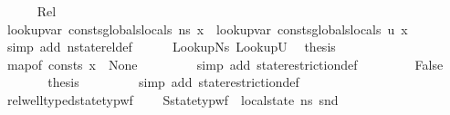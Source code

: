 \begin{isabellebody}
\ \ \ \ \isamarkupfalse%
\ Rel\ \isamarkupfalse%
\ {\isachardoublequoteopen}lookup{\isacharunderscore}{\kern0pt}var\ {\isacharparenleft}{\kern0pt}{\isacharparenleft}{\kern0pt}consts{\isacharat}{\kern0pt}globals{\isacharparenright}{\kern0pt}{\isacharcomma}{\kern0pt}locals{\isacharparenright}{\kern0pt}\ ns\ x\ {\isacharequal}{\kern0pt}\ lookup{\isacharunderscore}{\kern0pt}var\ {\isacharparenleft}{\kern0pt}{\isacharparenleft}{\kern0pt}consts{\isacharat}{\kern0pt}globals{}{\isacharparenright}{\kern0pt}{\isacharcomma}{\kern0pt}locals{}{\isacharparenright}{\kern0pt}\ u\ x{\isachardoublequoteclose}\isanewline
\ \ \ \ \ \ \isamarkupfalse%
\ {\isacharparenleft}{\kern0pt}simp\ add{\isacharcolon}{\kern0pt}\ nstate{\isacharunderscore}{\kern0pt}rel{\isacharunderscore}{\kern0pt}def{\isacharparenright}{\kern0pt}\isanewline
\ \ \ \ \isamarkupfalse%
\ LookupNs\ LookupU\ \isamarkupfalse%
\ {\isacharquery}{\kern0pt}thesis\ \isamarkupfalse%
\ {\isacartoucheopen}map{\isacharunderscore}{\kern0pt}of\ consts\ x\ {\isasymnoteq}\ None{\isacartoucheclose}\ \isanewline
\ \ \ \ \ \ \isamarkupfalse%
\ {\isacharparenleft}{\kern0pt}simp\ add{\isacharcolon}{\kern0pt}\ state{\isacharunderscore}{\kern0pt}restriction{\isacharunderscore}{\kern0pt}def{\isacharparenright}{\kern0pt}\isanewline
\ \ \isamarkupfalse%
\isanewline
\ \ \ \ \isamarkupfalse%
\ False\isanewline
\ \ \ \ \isamarkupfalse%
\ \isamarkupfalse%
\ {\isacharquery}{\kern0pt}thesis\ \isanewline
\ \ \ \ \ \ \isamarkupfalse%
\ {\isacharparenleft}{\kern0pt}simp\ add{\isacharcolon}{\kern0pt}\ state{\isacharunderscore}{\kern0pt}restriction{\isacharunderscore}{\kern0pt}def{\isacharparenright}{\kern0pt}\ \ \ \ \ \ \isanewline
\ \ \isamarkupfalse%
\isanewline
{}\isamarkupfalse%
%
\endisatagproof
{\isafoldproof}%
%
\isadelimproof
\isanewline
%
\endisadelimproof
\isanewline
{}\isamarkupfalse%
\ rel{\isacharunderscore}{\kern0pt}well{\isacharunderscore}{\kern0pt}typed{\isacharunderscore}{\kern0pt}state{\isacharunderscore}{\kern0pt}typ{\isacharunderscore}{\kern0pt}wf{\isacharcolon}{\kern0pt}\ \isanewline
\ \ \ S{}{\isacharcolon}{\kern0pt}{\isachardoublequoteopen}state{\isacharunderscore}{\kern0pt}typ{\isacharunderscore}{\kern0pt}wf\ {\isasymOmega}\ {\isacharparenleft}{\kern0pt}local{\isacharunderscore}{\kern0pt}state\ ns{\isacharparenright}{\kern0pt}\ {\isacharparenleft}{\kern0pt}snd\ {\isasymLambda}{\isacharparenright}{\kern0pt}{\isachardoublequoteclose}\ \isanewline

\end{isabellebody}

